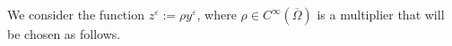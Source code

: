 \documentclass[11pt]{article}
\numberwithin{equation}{section}
\def\le{\leqslant}
\def\leq{\leqslant}
\begin{document}






\medskip

We consider the function $z^{\varepsilon}:=\rho y^{\varepsilon}$, where $\rho\in C^{\infty}(\overline{\Omega})$ is a multiplier that will be chosen as follows.
\end{document}
